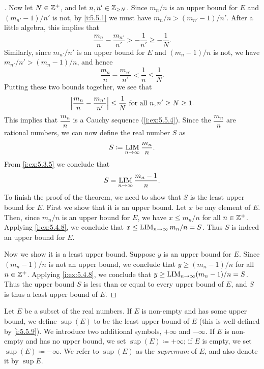 \begin{proof}[]
  Now let \(N \in \mathbb{Z}^+\), and let \(n, n' \in \mathbb{Z}_{\geq N}\).
  Since \(m_n / n\) is an upper bound for \(E\) and \((m_{n'} - 1) / n'\) is not, by \cref{i:5.5.1} we must have \(m_n / n > (m_{n'} - 1) / n'\).
  After a little algebra, this implies that
  \[
    \dfrac{m_n}{n} - \dfrac{m_{n'}}{n'} > -\dfrac{1}{n'} \geq -\dfrac{1}{N}.
  \]
  Similarly, since \(m_{n'} / n'\) is an upper bound for \(E\) and \((m_n - 1) / n\) is not, we have \(m_{n'} / n' > (m_n - 1) / n\), and hence
  \[
    \dfrac{m_n}{n} - \dfrac{m_{n'}}{n'} < \dfrac{1}{n} \leq \dfrac{1}{N}.
  \]
  Putting these two bounds together, we see that
  \[
    \left\lvert\dfrac{m_n}{n} - \dfrac{m_{n'}}{n'}\right\rvert \leq \dfrac{1}{N} \text{ for all } n, n' \geq N \geq 1.
  \]
  This implies that \(\dfrac{m_n}{n}\) is a Cauchy sequence (\cref{i:ex:5.5.4}).
  Since the \(\dfrac{m_n}{n}\) are rational numbers, we can now define the real number \(S\) as
  \[
    S \coloneqq \operatorname*{LIM}_{n \to \infty} \dfrac{m_n}{n}.
  \]
  From \cref{i:ex:5.3.5} we conclude that
  \[
    S = \operatorname*{LIM}_{n \to \infty} \dfrac{m_n - 1}{n}.
  \]
  To finish the proof of the theorem, we need to show that \(S\) is the least upper bound for \(E\).
  First we show that it is an upper bound.
  Let \(x\) be any element of \(E\).
  Then, since \(m_n / n\) is an upper bound for \(E\), we have \(x \leq m_n / n\) for all \(n \in \mathbb{Z}^+\).
  Applying \cref{i:ex:5.4.8}, we conclude that \(x \leq \operatorname*{LIM}_{n \to \infty} m_n / n = S\).
  Thus \(S\) is indeed an upper bound for \(E\).

  Now we show it is a least upper bound.
  Suppose \(y\) is an upper bound for \(E\).
  Since \((m_n - 1) / n\) is not an upper bound, we conclude that \(y \geq (m_n - 1) / n\) for all \(n \in \mathbb{Z}^+\).
  Applying \cref{i:ex:5.4.8}, we conclude that \(y \geq \operatorname*{LIM}_{n \to \infty} (m_n - 1) / n = S\).
  Thus the upper bound \(S\) is less than or equal to every upper bound of \(E\), and \(S\) is thus a least upper bound of \(E\).
\end{proof}

\begin{defn}[Supremum]\label{i:5.5.10}
  Let \(E\) be a subset of the real numbers.
  If \(E\) is non-empty and has some upper bound, we define \(\sup(E)\) to be the least upper bound of \(E\)
  (this is well-defined by \cref{i:5.5.9}).
  We introduce two additional symbols, \(+\infty\) and \(-\infty\).
  If \(E\) is non-empty and has no upper bound, we set \(\sup(E) \coloneqq +\infty\);
  if \(E\) is empty, we set \(\sup(E) \coloneqq -\infty\).
  We refer to \(\sup(E)\) as the \emph{supremum} of \(E\), and also denote it by \(\sup E\).
\end{defn}

